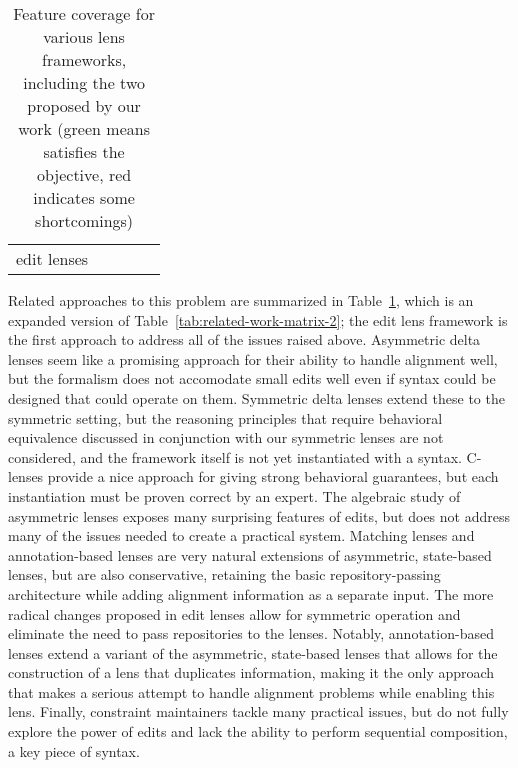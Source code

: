 \begin{table}
\begin{center}
\begin{tabularx}{\linewidth}{m{4.65em}|XXXX}
                        &\N[no]
                        &
        \\\hline
        edit lenses     &\Y[edits]
                        &
                        &
                        &
    \end{tabularx}
    \end{center}
    \caption[Feature coverage for various lens frameworks]{Feature coverage
        for various lens frameworks, including the two
        proposed by our work (\colorbox{accessiblegreen}{green} means
        satisfies the objective, \colorbox{accessiblered}{red} indicates
        some shortcomings)}
    \label{tab:related-commentary}
\end{table}

Related approaches to this problem are summarized in
Table~\ref{tab:related-commentary}, which is an expanded version of
Table~\ref{tab:related-work-matrix-2}; the edit lens framework is the first
approach to address all of the issues raised above. Asymmetric delta lenses
seem like a promising approach for their ability to handle alignment well,
but the formalism does not accomodate small edits well even if syntax could
be designed that could operate on them. Symmetric delta lenses extend these
to the symmetric setting, but the reasoning principles that require
behavioral equivalence discussed in conjunction with our symmetric lenses
are not considered, and the framework itself is not yet instantiated with a
syntax. C-lenses provide a nice approach for giving strong behavioral
guarantees, but each instantiation must be proven correct by an expert. The
algebraic study of asymmetric lenses exposes many surprising features of
edits, but does not address many of the issues needed to create a practical
system. Matching lenses and annotation-based lenses are very natural
extensions of asymmetric, state-based lenses, but are also conservative,
retaining the basic repository-passing architecture while adding alignment
information as a separate input. The more radical changes proposed in edit
lenses allow for symmetric operation and eliminate the need to pass
repositories to the lenses. Notably, annotation-based lenses extend a
variant of the asymmetric, state-based lenses that allows for the
construction of a lens that duplicates information, making it the only
approach that makes a serious attempt to handle alignment problems while
enabling this lens. Finally, constraint maintainers tackle many practical
issues, but do not fully explore the power of edits and lack the ability to
perform sequential composition, a key piece of syntax.

